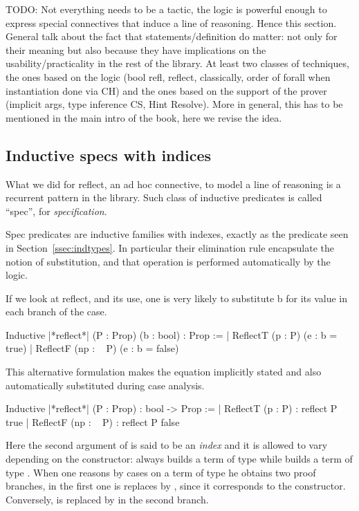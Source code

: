 TODO: Not everything needs to be a tactic, the logic is powerful
enough to express special connectives that induce a line of
reasoning. Hence this section.
General talk about the fact that statements/definition do matter: not only for
their meaning but also because they have implications on the
usability/practicality in the rest of the library.  At least two classes of
techniques, the ones based on the logic (bool refl, reflect, classically, order
of forall when instantiation done via CH) and the ones based on the support of
the prover (implicit args, type inference CS, Hint Resolve).
More in general, this has to be mentioned in the main intro of the book, here
we revise the idea.

\subsection{Inductive specs with indices}\label{ssec:specs}
What we did for reflect, an ad hoc connective, to model a line of reasoning is
a recurrent pattern in the \mcbMC{} library.  Such class of inductive
predicates is called ``spec'', for \emph{specification}.

Spec predicates are inductive families with indexes, exactly
as the  predicate seen in Section~\ref{ssec:indtypes}.
In particular their elimination rule encapsulate the notion
of substitution, and that operation is performed automatically by
the logic.

If we look at reflect, and its use, one is very likely to substitute b
for its value in each branch of the case.

\begin{coq}{}{}
Inductive |*reflect*| (P : Prop) (b : bool) : Prop :=
| ReflectT (p : P)    (e : b = true)
| ReflectF (np : ~ P) (e : b = false)
\end{coq}

This alternative formulation makes the equation implicitly stated and
also automatically substituted during case analysis.

\begin{coq}{}{}
Inductive |*reflect*| (P : Prop) : bool -> Prop :=
| ReflectT (p : P)    : reflect P true
| ReflectF (np : ~ P) : reflect P false
\end{coq}

Here the second argument of  is said to be an \emph{index}
and it is allowed to vary depending on the constructor:  always
builds a term of type  while  builds
a term of type .  When one reasons
by cases on a term of type  he obtains two proof
branches, in the first one  is replaces by , since it
corresponds to the  constructor.  Conversely,
 is replaced by in the second branch.

